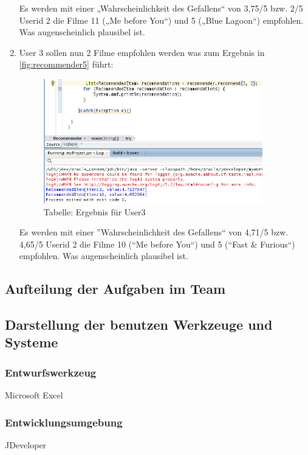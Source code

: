 \begin{enumerate}
Es werden mit einer „Wahrscheinlichkeit des Gefallens“ von 3,75/5 bzw. 2/5 Userid 2 die Filme 11 („Me before You“) und 5 („Blue Lagoon“) empfohlen. Was augenscheinlich plausibel ist.

\item User 3 sollen nun 2 Filme empfohlen werden was zum Ergebnis in \autoref{fig:recommender5} führt:
\begin{figure}[!htb]
        \begin{minipage}{1\textwidth}
                \centering
                \includegraphics[width=0.90\textwidth]{pics/recommender5.png}\par\vspace{0cm}
                \caption{Tabelle: Ergebnis für User3}
                \label{fig:recommender5}
        \end{minipage}
\end{figure}


Es werden mit einer ''Wahrscheinlichkeit des Gefallens`` von 4,71/5 bzw. 4,65/5 Userid 2 die Filme 10 (``Me before You``) und 5 (``Fast \& Furious``) empfohlen. Was augenscheinlich plausibel ist.

\end{enumerate}

\subsection{Aufteilung der Aufgaben im Team}
\subsection{Darstellung der benutzen Werkzeuge und Systeme}
\subsubsection*{Entwurfswerkzeug}
Microsoft Excel
\subsubsection*{Entwicklungsumgebung}
JDeveloper

